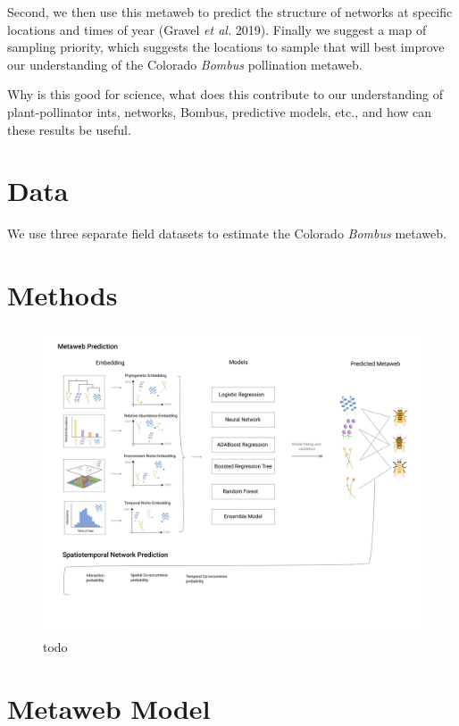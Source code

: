 \documentclass[11pt]{article}
\makeatletter
\def\maxwidth{\ifdim\Gin@nat@width>\linewidth\linewidth
\else\Gin@nat@width\fi}
\let\Oldincludegraphics\includegraphics
\renewcommand{\includegraphics}[1]{\Oldincludegraphics[width=\maxwidth]{#1}}
\makeatother
\begin{document}
Second, we then use this metaweb to predict the structure of networks at
specific locations and times of year (Gravel \emph{et al.} 2019).
Finally we suggest a map of sampling priority, which suggests the
locations to sample that will best improve our understanding of the
Colorado \emph{Bombus} pollination metaweb.

Why is this good for science, what does this contribute to our
understanding of plant-pollinator ints, networks, Bombus, predictive
models, etc., and how can these results be useful.

\hypertarget{data}{%
\section{Data}\label{data}}

We use three separate field datasets to estimate the Colorado
\emph{Bombus} metaweb.

\hypertarget{methods}{%
\section{Methods}\label{methods}}

\begin{figure}
\centering
\includegraphics{./figures/concept.png}
\caption{todo}
\end{figure}

\hypertarget{metaweb-model}{%
\section{Metaweb Model}\label{metaweb-model}}
\end{document}
